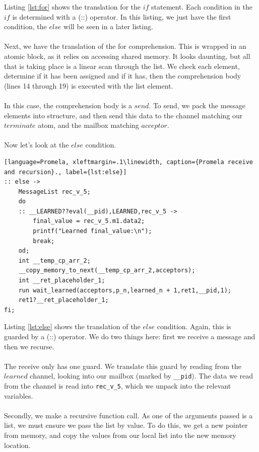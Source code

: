 Listing \ref{lst:for} shows the translation for the $if$ statement. Each condition in the $if$ is determined with a (::) operator. In this listing, we just have the first condition, the $else$ will be seen in a later listing. 
\\ \\
Next, we have the translation of the for comprehension. This is wrapped in an atomic block, as it relies on accessing shared memory. It looks daunting, but all that is taking place is a linear scan through the list. We check each element, determine if it has been assigned and if it has, then the comprehension body (lines 14 through 19) is executed with the list element.
\\ \\
In this case, the comprehension body is a $send$. To send, we pack the message elements into structure, and then send this data to the channel matching our $terminate$ atom, and the mailbox matching $acceptor$.
\\ \\
Now let's look at the $else$ condition.
\begin{lstlisting}[language=Promela, xleftmargin=.1\linewidth, caption={Promela receive and recursion}., label={lst:else}]
:: else -> 
    MessageList rec_v_5;
    do
    :: __LEARNED??eval(__pid),LEARNED,rec_v_5 -> 
        final_value = rec_v_5.m1.data2;
        printf("Learned final_value:\n");
        break;
    od;
    int __temp_cp_arr_2;
    __copy_memory_to_next(__temp_cp_arr_2,acceptors);
    int __ret_placeholder_1;
    run wait_learned(acceptors,p_n,learned_n + 1,ret1,__pid,1);
    ret1?__ret_placeholder_1;
fi;
\end{lstlisting}
Listing \ref{lst:else} shows the translation of the $else$ condition. Again, this is guarded by a (::) operator. We do two things here: first we receive a message and then we recurse.
\\ \\
The receive only has one guard. We translate this guard by reading from the $learned$ channel, looking into our mailbox (marked by \texttt{\_\_pid}). The data we read from the channel is read into \texttt{rec\_v\_5}, which we unpack into the relevant variables.
\\ \\
Secondly, we make a recursive function call. As one of the arguments passed is a list, we must ensure we pass the list by value. To do this, we get a new pointer from memory, and copy the values from our local list into the new memory location.
\\ \\
